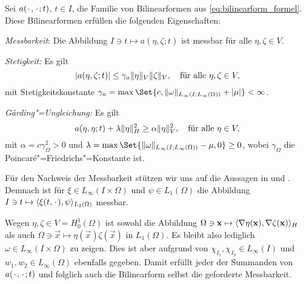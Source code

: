 \documentclass[../main.tex]{subfiles}
\begin{document}
\begin{Satz}
\label{satz:bilinearform_messbar_stetig_garding}
    Sei $a({\mkern2mu\cdot\mkern2mu}, {\mkern2mu\cdot\mkern2mu}; t)$, $t \in I$, die Familie von Bilinearformen aus \cref{eq:bilinearform_formel}.
    Diese Bilinearformen erfüllen die folgenden Eigenschaften:
    \begin{thmenumerate}
        \item\label{satz:bilinearform_messbar_stetig_garding:messbar}
        \emph{Messbarkeit}: Die Abbildung $I \ni t \mapsto a(\eta, \zeta; t)$ ist messbar für alle $\eta, \zeta \in V$.
        \item\label{satz:bilinearform_messbar_stetig_garding:stetig}
        \emph{Stetigkeit:} Es gilt
        \begin{equation}
            \label{eq:bilinearform_messbar_stetig_garding:stetig}
            \abs{a(\eta, \zeta; t)} \leq \gamma_{a} \norm{\eta}_{V} \norm{\zeta}_{V}, \quad \fa \eta, \zeta \in V,
        \end{equation}
        mit Stetigkeitskonstante $\gamma_{a} = \max\Set{c, \norm{\omega}_{L_{\infty}(I; L_{\infty}(\Omega))} + \abs{\mu}} < \infty$.
        \item\label{satz:bilinearform_messbar_stetig_garding:garding}
        \emph{G\aa{}rding"=Ungleichung:} Es gilt
        \begin{equation}
            \label{eq:bilinearform_messbar_stetig_garding:garding}
            a(\eta, \eta; t) + \lambda \norm{\eta}_{H}^{2} \geq \alpha \norm{\eta}_{V}^{2}, \quad \fa \eta \in V,
        \end{equation}
        mit $\alpha = c \gamma_{\Omega}^{2} > 0$ und $\lambda = \max\Set{\norm{\omega}_{L_{\infty}(I; L_{\infty}(\Omega))} - \mu, 0} \geq 0$, wobei $\gamma_{\Omega}$ die Poincaré"=Friedrichs"=Konstante ist.
    \end{thmenumerate}

    \begin{Beweis}
        Für den Nachweis der Messbarkeit stützen wir uns auf die Aussagen in \cite[177]{fattorini2005infinite} und \cite[Theorem 2.7.9, Corollary 2.7.10, Lemma 8.1.1]{Andreev:2012ep}.
        Demnach ist für $\xi \in L_{\infty}(I \times \Omega)$ und $\psi \in L_{1}(\Omega)$ die Abbildung $I \ni t \mapsto \langle\xi(t, {\mkern2mu\cdot\mkern2mu}),\psi\rangle_{L_{2}(\Omega)}$ messbar.

        Wegen $\eta, \zeta \in V = H^{1}_{0}(\Omega)$ ist sowohl die Abbildung $\Omega \ni \mathbf{x} \mapsto \langle\nabla \eta(\mathbf{x}),\nabla \zeta (\mathbf{x})\rangle_{H}$ als auch $\Omega \ni \vec x \mapsto \eta(\vec{x})\zeta (\vec x)$ in $L_{1}(\Omega)$.
        Es bleibt also lediglich $\omega \in L_{\infty}(I \times \Omega)$ zu zeigen.
        Dies ist aber aufgrund von $\chi_{I_{1}}, \chi_{I_{2}} \in L_{\infty}(I)$ und $w_{1}, w_{2} \in L_{\infty}(\Omega)$ ebenfalls gegeben.
        Damit erfüllt jeder der Summanden von $a({\mkern2mu\cdot\mkern2mu}, {\mkern2mu\cdot\mkern2mu}; t)$ und folglich auch die Bilinearform selbst die geforderte Messbarkeit.


\end{Beweis}
\end{Satz}
\end{document}

